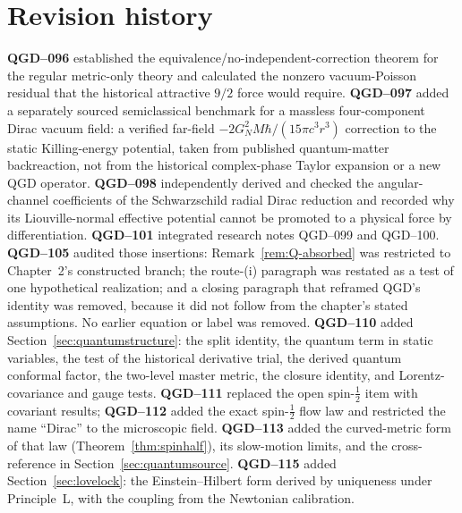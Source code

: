 \documentclass[11pt,a4paper]{article}
\begin{document}
\section*{Revision history}\label{sec:revision-history}
\textbf{QGD--096} established the equivalence/no-independent-correction
theorem for the regular metric-only theory and calculated the nonzero
vacuum-Poisson residual that the historical attractive $9/2$ force would
require. \textbf{QGD--097} added a separately sourced semiclassical
benchmark for a massless four-component Dirac vacuum field: a verified
far-field $-2G_N^2M\hbar/(15\pi c^3r^3)$ correction to the static
Killing-energy potential, taken from published quantum-matter backreaction,
not from the historical complex-phase Taylor expansion or a new QGD
operator. \textbf{QGD--098} independently derived and checked the
angular-channel coefficients of the Schwarzschild radial Dirac reduction and
recorded why its Liouville-normal effective potential cannot be promoted to
a physical force by differentiation. \textbf{QGD--101} integrated research
notes QGD--099 and QGD--100. \textbf{QGD--105} audited those insertions:
Remark~\ref{rem:Q-absorbed} was restricted to Chapter~2's constructed branch;
the route-(i) paragraph was restated as a test of one hypothetical realization;
and a closing paragraph that reframed QGD's identity was removed, because it
did not follow from the chapter's stated assumptions. No earlier equation or
label was removed. \textbf{QGD--110} added Section~\ref{sec:quantumstructure}: the
split identity, the quantum term in static variables, the test of the historical
derivative trial, the derived quantum conformal factor, the two-level master metric,
the closure identity, and Lorentz-covariance and gauge tests. \textbf{QGD--111} replaced
the open spin-$\frac12$ item with covariant results; \textbf{QGD--112} added the exact
spin-$\frac12$ flow law and restricted the name ``Dirac'' to the microscopic field.
\textbf{QGD--113} added the curved-metric form of that law (Theorem~\ref{thm:spinhalf}),
its slow-motion limits, and the cross-reference in Section~\ref{sec:quantumsource}.
\textbf{QGD--115} added Section~\ref{sec:lovelock}: the Einstein--Hilbert form derived by
uniqueness under Principle~L, with the coupling from the Newtonian calibration.
\end{document}
